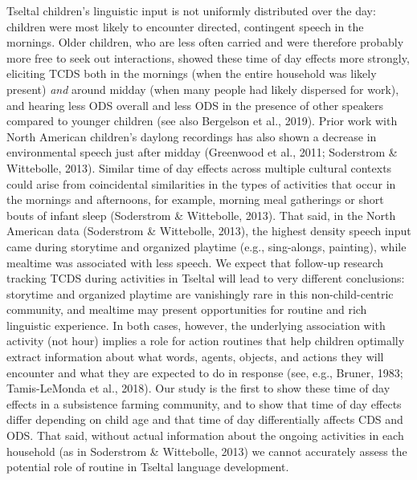 \documentclass[,man,floatsintext]{apa6}
\begin{document}
Tseltal children's linguistic input is not uniformly distributed over
the day: children were most likely to encounter directed, contingent
speech in the mornings. Older children, who are less often carried and
were therefore probably more free to seek out interactions, showed these
time of day effects more strongly, eliciting TCDS both in the mornings
(when the entire household was likely present) \emph{and} around midday
(when many people had likely dispersed for work), and hearing less ODS
overall and less ODS in the presence of other speakers compared to
younger children (see also Bergelson et al., 2019). Prior work with
North American children's daylong recordings has also shown a decrease
in environmental speech just after midday (Greenwood et al., 2011;
Soderstrom \& Wittebolle, 2013). Similar time of day effects across
multiple cultural contexts could arise from coincidental similarities in
the types of activities that occur in the mornings and afternoons, for
example, morning meal gatherings or short bouts of infant sleep
(Soderstrom \& Wittebolle, 2013). That said, in the North American data
(Soderstrom \& Wittebolle, 2013), the highest density speech input came
during storytime and organized playtime (e.g., sing-alongs, painting),
while mealtime was associated with less speech. We expect that follow-up
research tracking TCDS during activities in Tseltal will lead to very
different conclusions: storytime and organized playtime are vanishingly
rare in this non-child-centric community, and mealtime may present
opportunities for routine and rich linguistic experience. In both cases,
however, the underlying association with activity (not hour) implies a
role for action routines that help children optimally extract
information about what words, agents, objects, and actions they will
encounter and what they are expected to do in response (see, e.g.,
Bruner, 1983; Tamis-LeMonda et al., 2018). Our study is the first to
show these time of day effects in a subsistence farming community, and
to show that time of day effects differ depending on child age and that
time of day differentially affects CDS and ODS. That said, without
actual information about the ongoing activities in each household (as in
Soderstrom \& Wittebolle, 2013) we cannot accurately assess the
potential role of routine in Tseltal language development.
\end{document}
